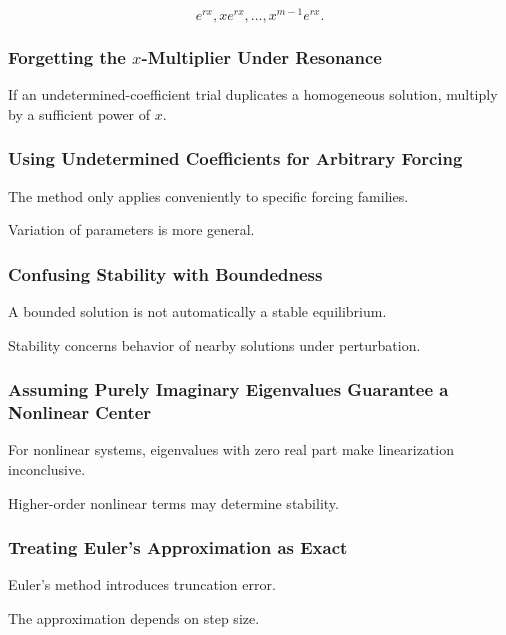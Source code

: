 \[
e^{rx},
xe^{rx},
\ldots,
x^{m-1}e^{rx}.
\]

\subsubsection{Forgetting the \(x\)-Multiplier Under Resonance}

If an undetermined-coefficient trial duplicates a homogeneous solution,
multiply by a sufficient power of \(x\).

\subsubsection{Using Undetermined Coefficients for Arbitrary Forcing}

The method only applies conveniently to specific forcing families.

Variation of parameters is more general.

\subsubsection{Confusing Stability with Boundedness}

A bounded solution is not automatically a stable equilibrium.

Stability concerns behavior of nearby solutions under perturbation.

\subsubsection{Assuming Purely Imaginary Eigenvalues Guarantee a Nonlinear Center}

For nonlinear systems, eigenvalues with zero real part make linearization
inconclusive.

Higher-order nonlinear terms may determine stability.

\subsubsection{Treating Euler's Approximation as Exact}

Euler's method introduces truncation error.

The approximation depends on step size.

